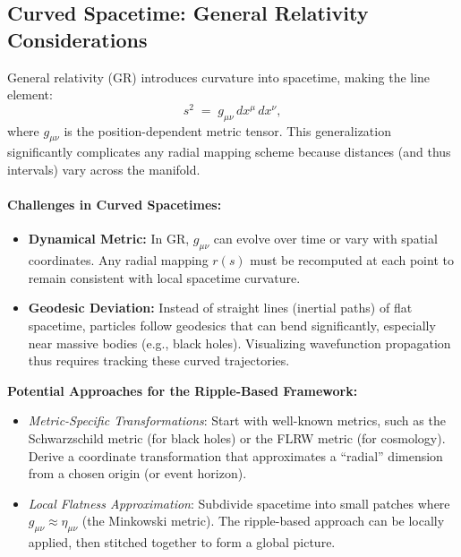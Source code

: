 \subsection{Curved Spacetime: General Relativity Considerations}
General relativity (GR) introduces curvature into spacetime, making the line element:
\[
s^2 \;=\; g_{\mu\nu} \, dx^\mu \, dx^\nu,
\]
where \(g_{\mu\nu}\) is the position-dependent metric tensor. This generalization significantly complicates any radial mapping scheme because distances (and thus intervals) vary across the manifold.

\paragraph{Challenges in Curved Spacetimes:}
\begin{itemize}
    \item \textbf{Dynamical Metric:}
    In GR, \(g_{\mu\nu}\) can evolve over time or vary with spatial coordinates. Any radial mapping \(r(s)\) must be recomputed at each point to remain consistent with local spacetime curvature.
    \item \textbf{Geodesic Deviation:}
    Instead of straight lines (inertial paths) of flat spacetime, particles follow geodesics that can bend significantly, especially near massive bodies (e.g., black holes). Visualizing wavefunction propagation thus requires tracking these curved trajectories.
\end{itemize}

\noindent
\textbf{Potential Approaches for the Ripple-Based Framework:}  
\begin{itemize}
    \item \textit{Metric-Specific Transformations}: Start with well-known metrics, such as the Schwarzschild metric (for black holes) or the FLRW metric (for cosmology). Derive a coordinate transformation that approximates a “radial” dimension from a chosen origin (or event horizon).
    \item \textit{Local Flatness Approximation}: Subdivide spacetime into small patches where \(g_{\mu\nu}\approx \eta_{\mu\nu}\) (the Minkowski metric). The ripple-based approach can be locally applied, then stitched together to form a global picture.
\end{itemize}


